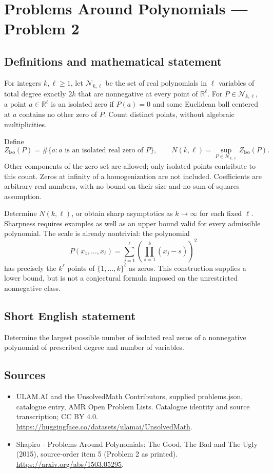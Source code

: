 \documentclass[11pt,a4paper]{article}
\begin{document}
\section*{Problems Around Polynomials — Problem 2}\label{statement}

\subsection{Definitions and mathematical statement}
For integers $k,\ell\geq1$, let $\mathcal N_{k,\ell}$ be the set of real
polynomials in $\ell$ variables of total degree exactly $2k$ that are
nonnegative at every point of $\mathbb R^\ell$. For $P\in\mathcal N_{k,\ell}$,
a point $a\in\mathbb R^\ell$ is an isolated zero if $P(a)=0$ and some
Euclidean ball centered at $a$ contains no other zero of $P$. Count
distinct points, without algebraic multiplicities.

Define
\[
 Z_{\mathrm{iso}}(P)=\#\{a:a\text{ is an isolated real zero of }P\},
 \qquad
 N(k,\ell)=\sup_{P\in\mathcal N_{k,\ell}}Z_{\mathrm{iso}}(P).
\]
Other components of the zero set are allowed; only isolated points
contribute to this count. Zeros at infinity of a homogenization are
not included. Coefficients are arbitrary real numbers, with no bound
on their size and no sum-of-squares assumption.

Determine $N(k,\ell)$, or obtain sharp asymptotics as $k\to\infty$ for
each fixed $\ell$. Sharpness requires examples as well as an upper
bound valid for every admissible polynomial. The scale is already
nontrivial: the polynomial
\[
 P(x_1,\ldots,x_\ell)=\sum_{j=1}^{\ell}
       \left(\prod_{s=1}^{k}(x_j-s)\right)^2
\]
has precisely the $k^\ell$ points of $\{1,\ldots,k\}^{\ell}$ as zeros.
This construction supplies a lower bound, but is not a conjectural
formula imposed on the unrestricted nonnegative class.
\subsection{Short English statement}
Determine the largest possible number of isolated real zeros of a nonnegative polynomial of prescribed degree and number of variables.
\subsection{Sources}
\begin{itemize}
\item[S1] ULAM.AI and the UnsolvedMath Contributors, supplied problems.json, catalogue entry, AMR Open Problem Lists. Catalogue identity and source transcription; CC BY 4.0.
\url{https://huggingface.co/datasets/ulamai/UnsolvedMath}.
\item[S2] Shapiro - Problems Around Polynomials: The Good, The Bad and The Ugly (2015), source-order item 5 (Problem 2 as printed). 
\url{https://arxiv.org/abs/1503.05295}.
\end{itemize}
\end{document}
